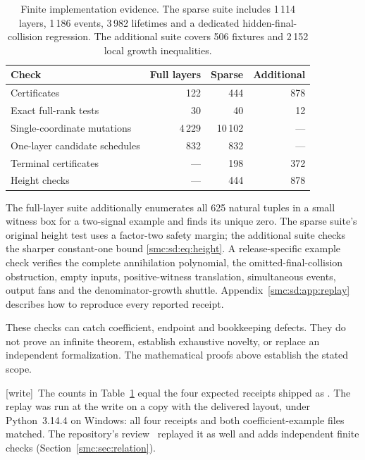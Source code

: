 \documentclass[11pt,letterpaper]{article}
\numberwithin{equation}{section}
\theoremstyle{definition}
\theoremstyle{remark}
\newcommand{\wtag}{\textup{[write]}}
\begin{document}
\begin{table}[ht]
\centering\small
\begin{tabular}{lrrr}
\toprule
Check & Full layers & Sparse & Additional \\
\midrule
Certificates & 122 & 444 & 878 \\
Exact full-rank tests & 30 & 40 & 12 \\
Single-coordinate mutations & 4\,229 & 10\,102 & --- \\
One-layer candidate schedules & 832 & 832 & --- \\
Terminal certificates & --- & 198 & 372 \\
Height checks & --- & 444 & 878 \\
\bottomrule
\end{tabular}
\caption{Finite implementation evidence. The sparse suite includes 1\,114 layers, 1\,186 events, 3\,982 lifetimes and a dedicated hidden-final-collision regression. The additional suite covers 506 fixtures and 2\,152 local growth inequalities.}\label{smc:sd:tab:replays}
\end{table}

The full-layer suite additionally enumerates all 625 natural tuples in a small witness box for a two-signal example and finds its unique zero. The sparse suite's original height test uses a factor-two safety margin; the additional suite checks the sharper constant-one bound \eqref{smc:sd:eq:height}. A release-specific example check verifies the complete annihilation polynomial, the omitted-final-collision obstruction, empty inputs, positive-witness translation, simultaneous events, output fans and the denominator-growth shuttle. Appendix~\ref{smc:sd:app:replay} describes how to reproduce every reported receipt.

These checks can catch coefficient, endpoint and bookkeeping defects. They do not prove an infinite theorem, establish exhaustive novelty, or replace an independent formalization. The mathematical proofs above establish the stated scope.


\wtag\ The counts in Table~\ref{smc:sd:tab:replays} equal the four expected receipts shipped as . The replay was run at the write on a copy with the delivered layout, under Python~3.14.4 on Windows: all four receipts and both coefficient-example files matched. The repository's review~\cite{reviewsignal} replayed it as well and adds independent finite checks (Section~\ref{smc:sec:relation}).
\end{document}

